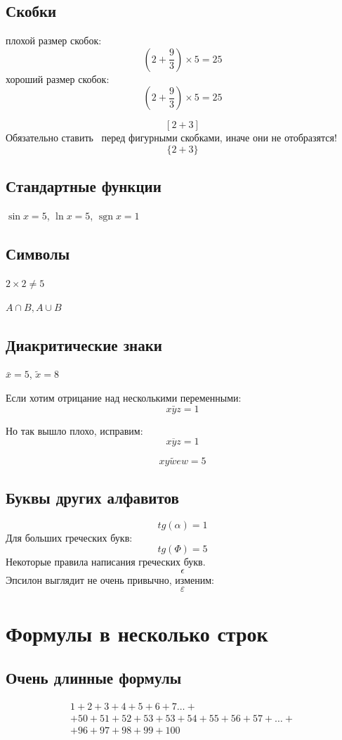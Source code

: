 \documentclass[a4paper, 12pt]{article}
\DeclareMathOperator{\sgn}{\mathop{sgn}}
\begin{document}
\subsection{Скобки}
плохой размер скобок:
\[(2 + \frac{9}{3})\times 5 = 25\]
хороший размер скобок:
\[\left(2 + \frac{9}{3}\right)\times 5 = 25\]

\[[2+3]\]
Обязательно ставить \ перед фигурными скобками, иначе они не отобразятся!
\[\{2+3\}\]

\subsection{Стандартные функции}

$\sin x = 5$, 
$\ln x = 5$,
$\sgn x = 1$

\subsection{Символы}\label{symbols}

$2\times 2 \ne 5$

$A \cap B,A \cup B$

\subsection{Диакритические знаки}

$\bar x =5$, $\tilde{x} = 8$

Если хотим отрицание над несколькими переменными:
\[\bar{xyz} = 1\]

Но так вышло плохо, исправим:
\[\overline{xyz} = 1\]

\[\widetilde{xywew} = 5\]

\subsection{Буквы других алфавитов}

\[tg(\alpha) = 1\]
Для больших греческих букв:
\[tg(\Phi) = 5\]
Некоторые правила написания греческих букв.
\[\epsilon\]
Эпсилон выглядит не очень привычно, изменим:
\[\varepsilon\]

\section{Формулы в несколько строк}

\subsection{Очень длинные формулы}
\begin{multline}
1+2+3+4+5+6+7 \dots + \\ + 50 + 51 + 52 + 53 + 53 + 54 + 55+ 56 + 57 + \dots + \\ + 96 + 97 + 98 + 99 + 100
\end{multline}
\end{document}
